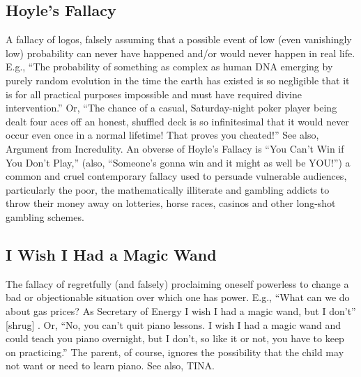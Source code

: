 \documentclass[10pt,a4paper,british]{article}
\begin{document}
\begin{multicols}{2}
	\subsection{Hoyle's Fallacy} A fallacy of logos, falsely assuming that a
	possible event of low (even vanishingly low) probability can never have
	happened and/or would never happen in real life. E.g., ``The probability of
	something as complex as human DNA emerging by purely random evolution in
	the time the earth has existed is so negligible that it is for all
	practical purposes impossible and must have required divine intervention.''
	Or, ``The chance of a casual, Saturday{-}night poker player being dealt
	four aces off an honest, shuffled deck is so infinitesimal that it would
	never occur even once in a normal lifetime!  That proves you cheated!'' See
	also, Argument from Incredulity. An obverse of Hoyle's Fallacy is ``You
	Can't Win if You Don't Play,'' (also, ``Someone's gonna win and it might as
	well be YOU!'') a common and cruel contemporary fallacy used to persuade
	vulnerable audiences, particularly the poor, the mathematically illiterate
	and gambling addicts to throw their money away on lotteries, horse races,
	casinos and other long{-}shot gambling schemes.

	\subsection{I Wish I Had a Magic Wand} The fallacy of regretfully (and
	falsely) proclaiming oneself powerless to change a bad or objectionable
	situation over which one has power. E.g., ``What can we do about gas
	prices? As Secretary of Energy I wish I had a magic wand, but I don't''
	[shrug] . Or, ``No, you can't quit piano lessons. I wish I had a magic wand
	and could teach you piano overnight, but I don't, so like it or not, you
	have to keep on practicing.'' The parent, of course, ignores the
	possibility that the child may not want or need to learn piano. See also,
	TINA.


\end{multicols}
\end{document}
